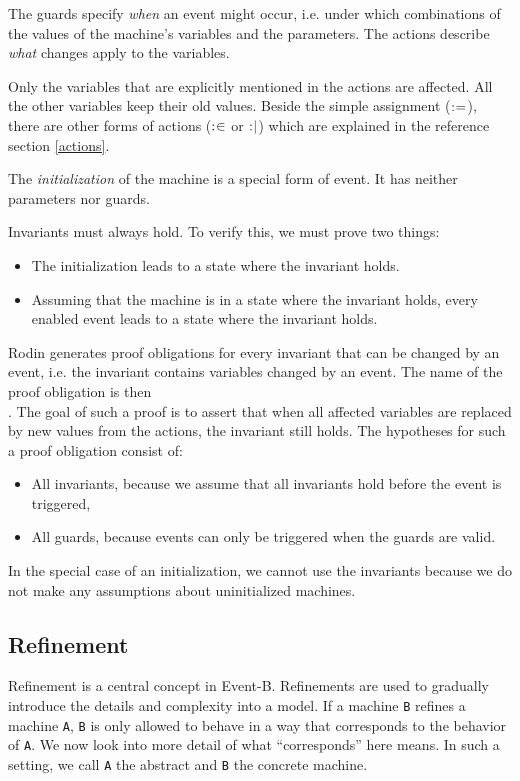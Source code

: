 The guards specify \emph{when} an event might occur, i.e. under which combinations
of the values of the machine's variables and the parameters.
The actions describe \emph{what} changes apply to the variables.

Only the variables that are explicitly mentioned in the actions are affected.
All the other variables keep their old values. Beside the simple assignment ($\mathrel{:\mkern1mu=}$),
there are other forms of actions ($\mathrel{:\mkern1mu\in}$ or $\mathrel{:\mkern1mu\mid}$) which are explained in
the reference section \ref{actions}.

The \emph{initialization} of the machine is a special form of event. It has neither parameters
nor guards.

Invariants must always hold. To verify this, we must prove two things:
\begin{itemize}
  \item The initialization leads to a state where the invariant holds.
  \item Assuming that the machine is in a state where the invariant holds,
    every enabled event leads to a state where the invariant holds.
\end{itemize}

Rodin generates proof obligations for every invariant that can be changed by an event, i.e. the invariant contains variables changed by an event.
The name of the proof obligation is then \\ .
The goal of such a proof is to assert that when all affected variables are replaced by new values from the actions, the invariant still holds. The hypotheses for such a proof obligation consist of:

\begin{itemize}

\item All invariants, because we assume that all invariants hold before the event is triggered,
\item All guards, because events can only be triggered when the guards are valid.
\end{itemize}

In the special case of an initialization, we cannot use the invariants because we do not
make any assumptions about uninitialized machines.

\subsection{Refinement}
\label{tut_refinement}
Refinement is a central concept in Event-B. Refinements are used to gradually
introduce the details and complexity into a model.
If a machine \texttt{B} refines a machine \texttt{A}, \texttt{B} is only allowed to behave in a way that
corresponds to the behavior of \texttt{A}. We now look into more detail of what ``corresponds''
here means.
In such a setting, we call \texttt{A} the abstract and \texttt{B} the concrete machine.

